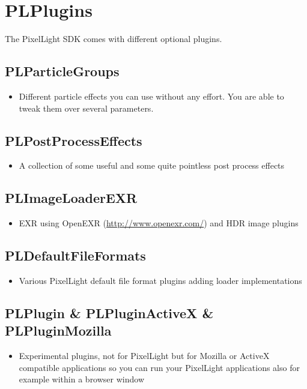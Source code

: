 \chapter{PLPlugins}
The PixelLight SDK comes with different optional plugins.





\section{PLParticleGroups}
\begin{itemize}
\item{Different particle effects you can use without any effort. You are able to tweak them over several parameters.}
\end{itemize}




\section{PLPostProcessEffects}
\begin{itemize}
\item{A collection of some useful and some quite pointless post process effects}
\end{itemize}




\section{PLImageLoaderEXR}
\begin{itemize}
\item{EXR using OpenEXR (\url{http://www.openexr.com/}) and HDR image plugins}
\end{itemize}




\section{ PLDefaultFileFormats}
\begin{itemize}
\item{Various PixelLight default file format plugins adding loader implementations}
\end{itemize}




\section{PLPlugin \& PLPluginActiveX \& PLPluginMozilla}
\begin{itemize}
\item{Experimental plugins, not for PixelLight but for Mozilla or ActiveX compatible applications so you can run your PixelLight applications also for example within a browser window}
\end{itemize}
